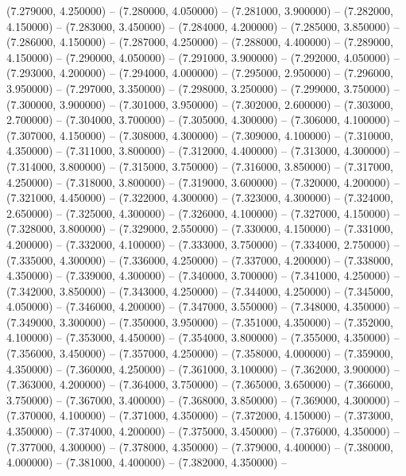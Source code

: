 (7.279000, 4.250000) -- 
(7.280000, 4.050000) -- 
(7.281000, 3.900000) -- 
(7.282000, 4.150000) -- 
(7.283000, 3.450000) -- 
(7.284000, 4.200000) -- 
(7.285000, 3.850000) -- 
(7.286000, 4.150000) -- 
(7.287000, 4.250000) -- 
(7.288000, 4.400000) -- 
(7.289000, 4.150000) -- 
(7.290000, 4.050000) -- 
(7.291000, 3.900000) -- 
(7.292000, 4.050000) -- 
(7.293000, 4.200000) -- 
(7.294000, 4.000000) -- 
(7.295000, 2.950000) -- 
(7.296000, 3.950000) -- 
(7.297000, 3.350000) -- 
(7.298000, 3.250000) -- 
(7.299000, 3.750000) -- 
(7.300000, 3.900000) -- 
(7.301000, 3.950000) -- 
(7.302000, 2.600000) -- 
(7.303000, 2.700000) -- 
(7.304000, 3.700000) -- 
(7.305000, 4.300000) -- 
(7.306000, 4.100000) -- 
(7.307000, 4.150000) -- 
(7.308000, 4.300000) -- 
(7.309000, 4.100000) -- 
(7.310000, 4.350000) -- 
(7.311000, 3.800000) -- 
(7.312000, 4.400000) -- 
(7.313000, 4.300000) -- 
(7.314000, 3.800000) -- 
(7.315000, 3.750000) -- 
(7.316000, 3.850000) -- 
(7.317000, 4.250000) -- 
(7.318000, 3.800000) -- 
(7.319000, 3.600000) -- 
(7.320000, 4.200000) -- 
(7.321000, 4.450000) -- 
(7.322000, 4.300000) -- 
(7.323000, 4.300000) -- 
(7.324000, 2.650000) -- 
(7.325000, 4.300000) -- 
(7.326000, 4.100000) -- 
(7.327000, 4.150000) -- 
(7.328000, 3.800000) -- 
(7.329000, 2.550000) -- 
(7.330000, 4.150000) -- 
(7.331000, 4.200000) -- 
(7.332000, 4.100000) -- 
(7.333000, 3.750000) -- 
(7.334000, 2.750000) -- 
(7.335000, 4.300000) -- 
(7.336000, 4.250000) -- 
(7.337000, 4.200000) -- 
(7.338000, 4.350000) -- 
(7.339000, 4.300000) -- 
(7.340000, 3.700000) -- 
(7.341000, 4.250000) -- 
(7.342000, 3.850000) -- 
(7.343000, 4.250000) -- 
(7.344000, 4.250000) -- 
(7.345000, 4.050000) -- 
(7.346000, 4.200000) -- 
(7.347000, 3.550000) -- 
(7.348000, 4.350000) -- 
(7.349000, 3.300000) -- 
(7.350000, 3.950000) -- 
(7.351000, 4.350000) -- 
(7.352000, 4.100000) -- 
(7.353000, 4.450000) -- 
(7.354000, 3.800000) -- 
(7.355000, 4.350000) -- 
(7.356000, 3.450000) -- 
(7.357000, 4.250000) -- 
(7.358000, 4.000000) -- 
(7.359000, 4.350000) -- 
(7.360000, 4.250000) -- 
(7.361000, 3.100000) -- 
(7.362000, 3.900000) -- 
(7.363000, 4.200000) -- 
(7.364000, 3.750000) -- 
(7.365000, 3.650000) -- 
(7.366000, 3.750000) -- 
(7.367000, 3.400000) -- 
(7.368000, 3.850000) -- 
(7.369000, 4.300000) -- 
(7.370000, 4.100000) -- 
(7.371000, 4.350000) -- 
(7.372000, 4.150000) -- 
(7.373000, 4.350000) -- 
(7.374000, 4.200000) -- 
(7.375000, 3.450000) -- 
(7.376000, 4.350000) -- 
(7.377000, 4.300000) -- 
(7.378000, 4.350000) -- 
(7.379000, 4.400000) -- 
(7.380000, 4.000000) -- 
(7.381000, 4.400000) -- 
(7.382000, 4.350000) -- 
